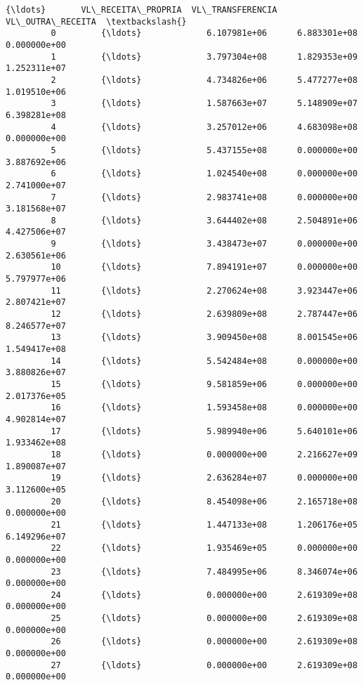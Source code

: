 \documentclass[11pt]{article}
\begin{document}
\begin{Verbatim}[commandchars=\\\{\}]
                   {\ldots}       VL\_RECEITA\_PROPRIA  VL\_TRANSFERENCIA VL\_OUTRA\_RECEITA  \textbackslash{}
         0         {\ldots}             6.107981e+06      6.883301e+08     0.000000e+00   
         1         {\ldots}             3.797304e+08      1.829353e+09     1.252311e+07   
         2         {\ldots}             4.734826e+06      5.477277e+08     1.019510e+06   
         3         {\ldots}             1.587663e+07      5.148909e+07     6.398281e+08   
         4         {\ldots}             3.257012e+06      4.683098e+08     0.000000e+00   
         5         {\ldots}             5.437155e+08      0.000000e+00     3.887692e+06   
         6         {\ldots}             1.024540e+08      0.000000e+00     2.741000e+07   
         7         {\ldots}             2.983741e+08      0.000000e+00     3.181568e+07   
         8         {\ldots}             3.644402e+08      2.504891e+06     4.427506e+07   
         9         {\ldots}             3.438473e+07      0.000000e+00     2.630561e+06   
         10        {\ldots}             7.894191e+07      0.000000e+00     5.797977e+06   
         11        {\ldots}             2.270624e+08      3.923447e+06     2.807421e+07   
         12        {\ldots}             2.639809e+08      2.787447e+06     8.246577e+07   
         13        {\ldots}             3.909450e+08      8.001545e+06     1.549417e+08   
         14        {\ldots}             5.542484e+08      0.000000e+00     3.880826e+07   
         15        {\ldots}             9.581859e+06      0.000000e+00     2.017376e+05   
         16        {\ldots}             1.593458e+08      0.000000e+00     4.902814e+07   
         17        {\ldots}             5.989940e+06      5.640101e+06     1.933462e+08   
         18        {\ldots}             0.000000e+00      2.216627e+09     1.890087e+07   
         19        {\ldots}             2.636284e+07      0.000000e+00     3.112600e+05   
         20        {\ldots}             8.454098e+06      2.165718e+08     0.000000e+00   
         21        {\ldots}             1.447133e+08      1.206176e+05     6.149296e+07   
         22        {\ldots}             1.935469e+05      0.000000e+00     0.000000e+00   
         23        {\ldots}             7.484995e+06      8.346074e+06     0.000000e+00   
         24        {\ldots}             0.000000e+00      2.619309e+08     0.000000e+00   
         25        {\ldots}             0.000000e+00      2.619309e+08     0.000000e+00   
         26        {\ldots}             0.000000e+00      2.619309e+08     0.000000e+00   
         27        {\ldots}             0.000000e+00      2.619309e+08     0.000000e+00   

\end{Verbatim}
\end{document}
